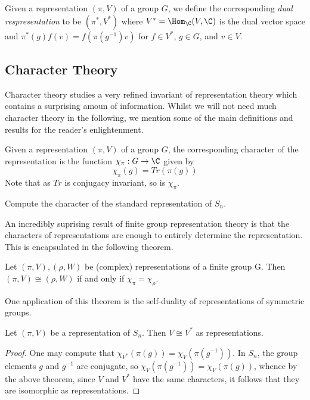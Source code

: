 \documentclass[../main.tex]{subfiles}
\begin{document}
\begin{definition}
    Given a representation $ (\pi,V) $ of a group $ G $, we define the corresponding \textit{dual respresentation} to be $ (\pi^{*}, V^{*}) $ where $ V^{*}=\Hom_{\C}(V,\C) $ is the dual vector space and $ \pi^{*}(g)f(v) = f(\pi(g^{-1})v) $ for $ f\in V^{*} $, $ g\in G $, and $ v\in V $.
\end{definition}



\subsection{Character Theory}

Character theory studies a very refined invariant of representation theory which contains a surprising amoun of information. Whilst we will not need much character theory in the following, we mention some of the main definitions and results for the reader's enlightenment.

\begin{definition}
    Given a representation $ (\pi,V) $ of a group $ G $, the corresponding character of the representation is the function $ \chi_{\pi}:G\to \C $ given by
    \[
        \chi_{\pi} (g) = Tr(\pi(g))
    \]
    Note that as $ Tr $ is conjugacy invariant, so is $ \chi_{\pi} $.
\end{definition}

\begin{exercise}
   Compute the character of the standard representation of $ S_{n} $.
\end{exercise}

An incredibly suprising result of finite group representation theory is that the characters of representations are enough to entirely determine the representation. This is encapsulated in the following theorem.

\begin{theorem}
    Let $ (\pi,V),(\rho,W) $ be (complex) representations of a finite group G. Then $ (\pi,V)\cong (\rho,W) $ if and only if $ \chi_{\pi}= \chi_{\rho} $.
\end{theorem}

One application of this theorem is the self-duality of representations of symmetric groups.

\begin{proposition}
    Let $ (\pi,V) $ be a representation of $ S_{n} $. Then $ V\cong V^{*} $ as representations.
\end{proposition}
\begin{proof}
    One may compute that $ \chi_{V^{*}}(\pi(g)) = \chi_{V}(\pi(g^{-1}))  $. In $ S_{n} $, the group elements $ g $ and $ g^{-1} $ are conjugate, so $ \chi_{V}(\pi(g^{-1}))= \chi_{V}(\pi(g)) $, whence by the above theorem, since $ V $ and $ V^{*} $ have the same characters, it follows that they are isomorphic as representations.
\end{proof}
\end{document}
